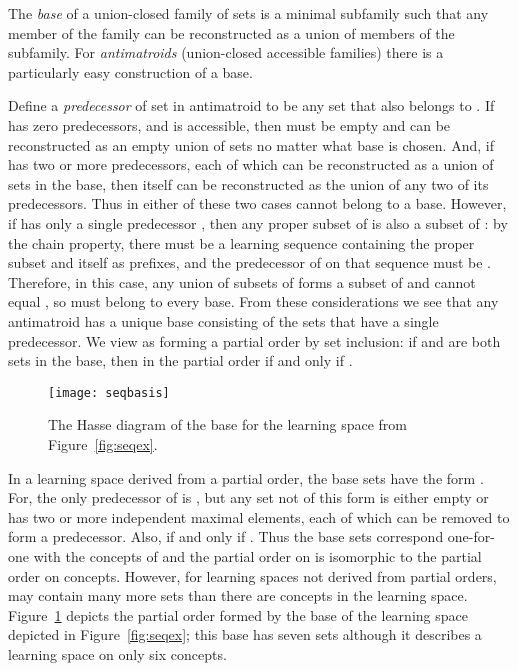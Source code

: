 \documentclass[11pt]{llncs}
\begin{document}
{The \emph{base} of a union-closed family of sets is a minimal subfamily such that any member of the family can be reconstructed as a union of members of the subfamily.
For \emph{antimatroids} (union-closed accessible families) there is a particularly easy construction of a base.

Define a \emph{predecessor} of set  in antimatroid  to be any set  that also belongs to . If  has zero predecessors, and  is accessible, then  must be empty and can be reconstructed as an empty union of sets no matter what base is chosen.
And, if  has two or more predecessors, each of which can be reconstructed as a union of sets in the base, then  itself can be reconstructed as the union of any two of its predecessors.
Thus in either of these two cases  cannot belong to a base.
However, if  has only a single predecessor , then any proper subset of  is also a subset of : by the chain property, there must be a learning sequence containing the proper subset and  itself as prefixes, and the predecessor of  on that sequence must be . Therefore, in this case, any union of subsets of  forms a subset of  and cannot equal , so  must belong to every base.
From these considerations we see that any antimatroid  has a unique base  consisting of the sets that have a single predecessor. We view  as forming a partial order by set inclusion: if  and  are both sets in the base, then  in the partial order if and only if .

\begin{figure}[t]
\centering\texttt{[image: seqbasis]}
\caption{The Hasse diagram of the base  for the learning space  from Figure~\ref{fig:seqex}.}
\label{fig:seqbasis}
\end{figure}

In a learning space  derived from a partial order, the base sets have the form . For, the only predecessor of  is , but any set not of this form is either empty or has two or more independent maximal elements, each of which can be removed to form a predecessor. Also,  if and only if . Thus the base sets correspond one-for-one with the concepts of  and the partial order on  is isomorphic to the partial order on concepts. However, for learning spaces not derived from partial orders,  may contain many more sets than there are concepts in the learning space.
Figure~\ref{fig:seqbasis} depicts the partial order formed by the base of the learning space depicted in Figure~\ref{fig:seqex}; this base has seven sets although it describes a learning space on only six concepts.

}
\end{document}
